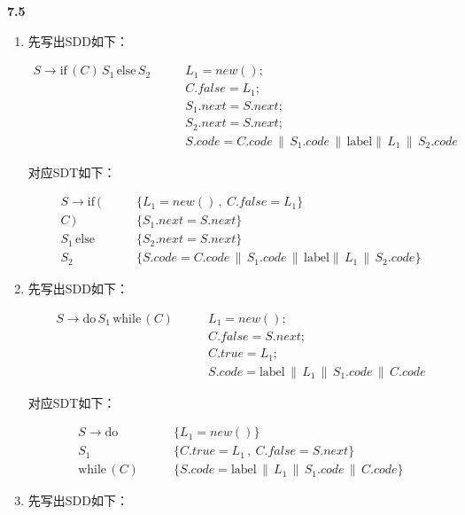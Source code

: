 \documentclass[UTF8]{report}
\newcommand{\tbf}[1]{\textbf{#1}}
\begin{document}
\noindent
\tbf{7.5}

\begin{enumerate}[label=(\arabic*)]
    \item 先写出SDD如下：
    
    \begin{align*}
        S \to \text{if} \, (C) \, S_1 \, \text{else} \, S_2 \qquad &L_1 = new(); \\
        &C.false = L_1; \\
        &S_1.next = S.next; \\
        &S_2.next = S.next; \\
        &S.code = C.code \, \| \, S_1.code \, \| \, \text{label} \| \, L_1 \, \| \, S_2.code
    \end{align*}

    对应SDT如下：

    \begin{align*}
        S \to \text{if} \, ( \qquad &\{L_1 = new() \,,\ C.false = L_1\} \\
        C \, ) \qquad &\{S_1.next = S.next\} \\
        S_1 \, \text{else} \qquad &\{S_2.next = S.next\} \\
        S_2 \qquad &\{S.code = C.code \, \| \, S_1.code \, \| \, \text{label} \| \, L_1 \, \| \, S_2.code\}
    \end{align*}

    \item 先写出SDD如下：
    
    \begin{align*}
        S \to \text{do} \, S_1 \, \text{while} \, (C) \qquad &L_1 = new(); \\
        &C.false = S.next; \\
        &C.true = L_1; \\
        &S.code = \text{label} \, \| \, L_1 \, \| \, S_1.code \, \| \, C.code
    \end{align*}

    对应SDT如下：

    \begin{align*}
        S \to \text{do} \qquad &\{L_1 = new()\} \\
        S_1 \qquad &\{C.true = L_1 \,,\ C.false = S.next\} \\
        \text{while} \, (C) \qquad &\{S.code = \text{label} \, \| \, L_1 \, \| \, S_1.code \, \| \, C.code\}
    \end{align*}

    \item 先写出SDD如下：
    

\end{enumerate}
\end{document}

